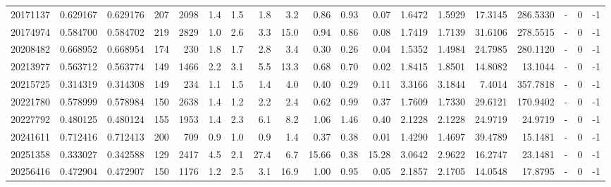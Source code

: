\begin{tabular}{rrrrrrrrrrrrrrrrlrr}
  20171137 & 0.629167 &   0.629176 &  207 & 2098 &      1.4 &      1.5 &     1.8 &      3.2 &       0.86 &        0.93 &        0.07 &  1.6472 &  1.5929 &   17.3145 &  286.5330 &             - &        0 &         -1 \\
  20174974 & 0.584700 &   0.584702 &  219 & 2829 &      1.0 &      2.6 &     3.3 &     15.0 &       0.94 &        0.86 &        0.08 &  1.7419 &  1.7139 &   31.6106 &  278.5515 &             - &        0 &         -1 \\
  20208482 & 0.668952 &   0.668954 &  174 &  230 &      1.8 &      1.7 &     2.8 &      3.4 &       0.30 &        0.26 &        0.04 &  1.5352 &  1.4984 &   24.7985 &  280.1120 &             - &        0 &         -1 \\
  20213977 & 0.563712 &   0.563774 &  149 & 1466 &      2.2 &      3.1 &     5.5 &     13.3 &       0.68 &        0.70 &        0.02 &  1.8415 &  1.8501 &   14.8082 &   13.1044 &             - &        0 &         -1 \\
  20215725 & 0.314319 &   0.314308 &  149 &  234 &      1.1 &      1.5 &     1.4 &      4.0 &       0.40 &        0.29 &        0.11 &  3.3166 &  3.1844 &    7.4014 &  357.7818 &             - &        0 &         -1 \\
  20221780 & 0.578999 &   0.578984 &  150 & 2638 &      1.4 &      1.2 &     2.2 &      2.4 &       0.62 &        0.99 &        0.37 &  1.7609 &  1.7330 &   29.6121 &  170.9402 &             - &        0 &         -1 \\
  20227792 & 0.480125 &   0.480124 &  155 & 1953 &      1.4 &      2.3 &     6.1 &      8.2 &       1.06 &        1.46 &        0.40 &  2.1228 &  2.1228 &   24.9719 &   24.9719 &             - &        0 &         -1 \\
  20241611 & 0.712416 &   0.712413 &  200 &  709 &      0.9 &      1.0 &     0.9 &      1.4 &       0.37 &        0.38 &        0.01 &  1.4290 &  1.4697 &   39.4789 &   15.1481 &             - &        0 &         -1 \\
  20251358 & 0.333027 &   0.342588 &  129 & 2417 &      4.5 &      2.1 &    27.4 &      6.7 &      15.66 &        0.38 &       15.28 &  3.0642 &  2.9622 &   16.2747 &   23.1481 &             - &        0 &         -1 \\
  20256416 & 0.472904 &   0.472907 &  150 & 1176 &      1.2 &      2.5 &     3.1 &     16.9 &       1.00 &        0.95 &        0.05 &  2.1857 &  2.1705 &   14.0548 &   17.8795 &             - &        0 &         -1 \\

\end{tabular}
